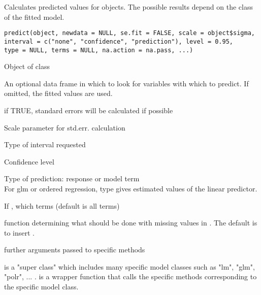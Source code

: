 \documentclass{article}
\begin{document}
\begin{Description}\relax
Calculates predicted values for  objects.
The possible results depend on the class of the fitted model.
\end{Description}
\begin{Usage}
\begin{verbatim}
predict(object, newdata = NULL, se.fit = FALSE, scale = object$sigma,
interval = c("none", "confidence", "prediction"), level = 0.95,
type = NULL, terms = NULL, na.action = na.pass, ...)
\end{verbatim}
\end{Usage}
\begin{Arguments}
\begin{ldescription}
\item[\code{object}] Object of class 
\item[\code{newdata}] An optional data frame in which to look for variables with
which to predict.  If omitted, the fitted values are used.
\item[\code{se.fit}] if TRUE, standard errors will be calculated if possible
\item[\code{scale}] Scale parameter for std.err. calculation
\item[\code{interval}] Type of interval requested
\item[\code{level}] Confidence level
\item[\code{type}] Type of prediction: response or model term\\
For glm or ordered regression, type  gives estimated values
of the linear predictor.
\item[\code{terms}] If , which terms (default is all terms)
\item[\code{na.action}] function determining what should be done with missing values
in .  The default is to insert .
\item[\code{...}] further arguments passed to specific methods
\end{ldescription}
\end{Arguments}
\begin{Details}\relax
{} is a "super class" which includes many specific model
classes such as "lm", "glm", "polr", ... .
 is a wrapper function that calls the specific methods
corresponding to the specific model class.
\end{Details}
\end{document}
